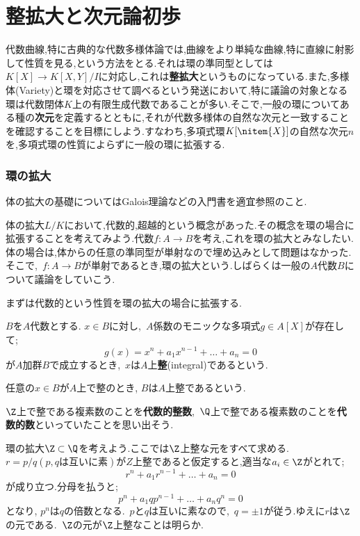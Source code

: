 \newpage
\part[Integral extension and The elemnts of dimension theory]{整拡大と次元論初歩}\label{part:整拡大と次元論初歩}

代数曲線,特に古典的な代数多様体論では,曲線をより単純な曲線,特に直線に射影して性質を見る,という方法をとる.それは環の準同型としては$K[X]\to K[X,Y]/I$に対応し,これは\textbf{整拡大}というものになっている.また,多様体(Variety)と環を対応させて調べるという発送において,特に議論の対象となる環は代数閉体$K$上の有限生成代数であることが多い.そこで,一般の環についてある種の\textbf{次元}を定義するとともに,それが代数多様体の自然な次元と一致することを確認することを目標にしよう.すなわち,多項式環$K[\nitem{X}]$の自然な次元$n$を,多項式環の性質によらずに一般の環に拡張する.

\section{環の拡大}

体の拡大の基礎についてはGalois理論などの入門書を適宜参照のこと.

体の拡大$L/K$において,代数的,超越的という概念があった.その概念を環の場合に拡張することを考えてみよう.代数$f:A\to B$を考え,これを環の拡大とみなしたい.体の場合は,体からの任意の準同型が単射なので埋め込みとして問題はなかった.そこで,~$f:A\to B$が単射であるとき,環の拡大という.しばらくは一般の$A$代数$B$について議論をしていこう.

まずは代数的という性質を環の拡大の場合に拡張する.

\begin{defi}[整]
	$B$を$A$代数とする. $x\in B$に対し,~$A$係数のモニックな多項式$g\in A[X]$が存在して;
	\[g(x)=x^n+a_1x^{n-1}+\dots+a_n=0\]
	が$A$加群$B$で成立するとき,~$x$は$A$上\textbf{整}(integral)であるという.
\end{defi}

任意の$x\in B$が$A$上で整のとき, $B$は$A$上整であるという.

$\Z$上で整である複素数のことを\textbf{代数的整数},~$\Q$上で整である複素数のことを\textbf{代数的数}といっていたことを思い出そう.

\begin{ex}\label{ex:Q/Zの整閉包}
	環の拡大$\Z\subset\Q$を考えよう.ここでは$\Z$上整な元をすべて求める.~$r=p/q (p,q\text{は互いに素})$が$Z$上整であると仮定すると,適当な$a_i\in\Z$がとれて;
	\[r^n+a_1r^{n-1}+\dots+a_n=0\]
	が成り立つ.分母を払うと;
	\[p^n+a_1qp^{n-1}+\dots+a_nq^n=0\]
	となり, $p^n$は$q$の倍数となる.~$p$と$q$は互いに素なので,~$q=\pm 1$が従う.ゆえに$r$は$\Z$の元である.~$\Z$の元が$\Z$上整なことは明らか.
\end{ex}

